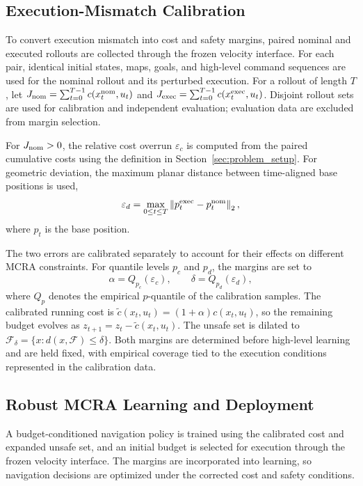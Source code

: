 \documentclass[conference]{IEEEtran}
\begin{document}
\subsection{Execution-Mismatch Calibration}
\label{sec:execution_calibration}
To convert execution mismatch into cost and safety margins, paired nominal and
executed rollouts are collected through the frozen velocity interface. For each pair, identical initial states, maps, goals, and high-level command
sequences are used for the nominal rollout and its perturbed execution. For a rollout of length $T$,
let
$J_{\rm nom}=\sum_{t=0}^{T-1}c(x_t^{\rm nom},u_t)$ and
$J_{\rm exec}=\sum_{t=0}^{T-1}c(x_t^{\rm exec},u_t)$. Disjoint rollout sets are used for calibration and independent evaluation;
evaluation data are excluded from margin selection.

For $J_{\rm nom}>0$, the relative cost overrun $\varepsilon_c$ is computed from
the paired cumulative costs using the definition in Section~\ref{sec:problem_setup}. For geometric
deviation, the maximum planar distance between time-aligned base positions is used,
\begin{equation}
\varepsilon_d=\max_{0\leq t\leq T} \left\|p_t^{\rm exec}-p_t^{\rm nom}\right\|_2,
\label{eq:max_planar_deviation}
\end{equation}
where $p_t$ is the base position.

The two errors are calibrated separately to account for their effects on different
MCRA constraints. For quantile levels $p_c$ and $p_d$, the margins are set to
\begin{equation}
\alpha=Q_{p_c}(\varepsilon_c),\qquad
\delta=Q_{p_d}(\varepsilon_d),
\label{eq:calibration_margins}
\end{equation}
where $Q_p$ denotes the empirical $p$-quantile of the calibration samples. The
calibrated running cost is
$\tilde c(x_t,u_t)=(1+\alpha)c(x_t,u_t)$, so the remaining budget evolves as
$z_{t+1}=z_t-\tilde c(x_t,u_t)$. The unsafe set is dilated to
$\mathcal{F}_\delta=\{x:d(x,\mathcal{F})\leq\delta\}$. Both margins are determined
before high-level learning and are held fixed, with empirical coverage tied to the
execution conditions represented in the calibration data.

\subsection{Robust MCRA Learning and Deployment}
A budget-conditioned navigation policy is trained using the calibrated cost and
expanded unsafe set, and an initial budget is selected for execution through the
frozen velocity interface. The margins are incorporated into learning, so navigation
decisions are optimized under the corrected cost and safety conditions.
\end{document}
